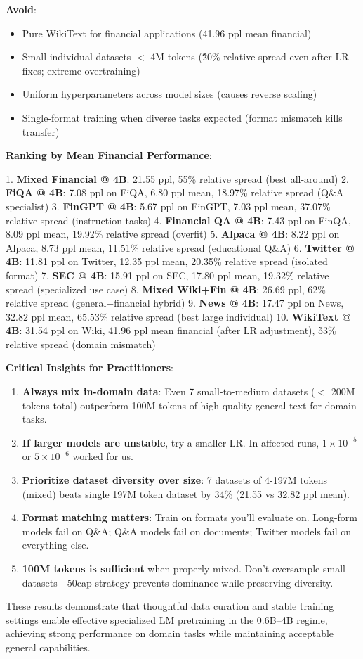 \textbf{Avoid}:
\begin{itemize}
\item Pure WikiText for financial applications (41.96 ppl mean financial)
\item Small individual datasets $<$ 4M tokens (\~20\% relative spread even after LR fixes; extreme overtraining)
\item Uniform hyperparameters across model sizes (causes reverse scaling)
\item Single-format training when diverse tasks expected (format mismatch kills transfer)
\end{itemize}

\textbf{Ranking by Mean Financial Performance}:

1. \textbf{Mixed Financial @ 4B}: 21.55 ppl, 55\% relative spread (best all-around)
2. \textbf{FiQA @ 4B}: 7.08 ppl on FiQA, 6.80 ppl mean, 18.97\% relative spread (Q\&A specialist)
3. \textbf{FinGPT @ 4B}: 5.67 ppl on FinGPT, 7.03 ppl mean, 37.07\% relative spread (instruction tasks)
4. \textbf{Financial QA @ 4B}: 7.43 ppl on FinQA, 8.09 ppl mean, 19.92\% relative spread (overfit)
5. \textbf{Alpaca @ 4B}: 8.22 ppl on Alpaca, 8.73 ppl mean, 11.51\% relative spread (educational Q\&A)
6. \textbf{Twitter @ 4B}: 11.81 ppl on Twitter, 12.35 ppl mean, 20.35\% relative spread (isolated format)
7. \textbf{SEC @ 4B}: 15.91 ppl on SEC, 17.80 ppl mean, 19.32\% relative spread (specialized use case)
8. \textbf{Mixed Wiki+Fin @ 4B}: 26.69 ppl, 62\% relative spread (general+financial hybrid)
9. \textbf{News @ 4B}: 17.47 ppl on News, 32.82 ppl mean, 65.53\% relative spread (best large individual)
10. \textbf{WikiText @ 4B}: 31.54 ppl on Wiki, 41.96 ppl mean financial (after LR adjustment), \~53\% relative spread (domain mismatch)

\textbf{Critical Insights for Practitioners}:

\begin{enumerate}
\item \textbf{Always mix in-domain data}: Even 7 small-to-medium datasets ($<$ 200M tokens total) outperform 100M tokens of high-quality general text for domain tasks.
\item \textbf{If larger models are unstable}, try a smaller LR. In affected runs, $1\times10^{-5}$ or $5\times10^{-6}$ worked for us.
\item \textbf{Prioritize dataset diversity over size}: 7 datasets of 4-197M tokens (mixed) beats single 197M token dataset by 34\% (21.55 vs 32.82 ppl mean).
\item \textbf{Format matching matters}: Train on formats you'll evaluate on. Long-form models fail on Q\&A; Q\&A models fail on documents; Twitter models fail on everything else.
\item \textbf{100M tokens is sufficient} when properly mixed. Don't oversample small datasets—50cap strategy prevents dominance while preserving diversity.
\end{enumerate}

These results demonstrate that thoughtful data curation and stable training settings enable effective specialized LM pretraining in the 0.6B–4B regime, achieving strong performance on domain tasks while maintaining acceptable general capabilities.
